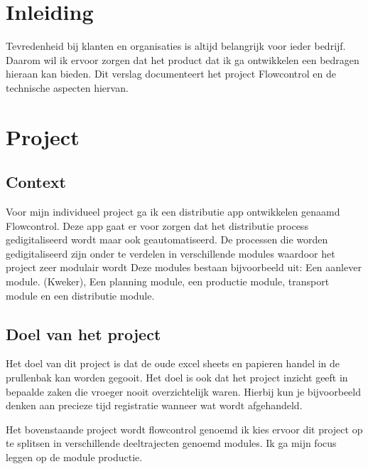 \documentclass[11pt, twoside]{report}
\begin{document}
    
    \newpage
    \tableofcontents
    \newpage

    \clearpage
    \setcounter{page}{1}

    \chapter{Inleiding}
    \label{ch:inleiding}
    Tevredenheid bij klanten en organisaties is altijd belangrijk voor ieder bedrijf.
    Daarom wil ik ervoor zorgen dat het product dat ik ga ontwikkelen een bedragen hieraan kan bieden.
    Dit verslag documenteert het project Flowcontrol en de technische aspecten hiervan.

    \chapter{Project}
    \label{ch:project}
    \section{Context}
    \label{sec:context}
    Voor mijn individueel project ga ik een distributie app ontwikkelen genaamd Flowcontrol.
    Deze app gaat er voor zorgen dat het distributie process gedigitaliseerd wordt maar ook geautomatiseerd.
    De processen die worden gedigitaliseerd zijn onder te verdelen in verschillende modules waardoor het project zeer modulair wordt
    Deze modules bestaan bijvoorbeeld uit: Een aanlever module. (Kweker), Een planning module, een productie module, transport module en een distributie module.

    \section{Doel van het project}
    \label{sec:doel-van-het-project}
    Het doel van dit project is dat de oude excel sheets en papieren handel in de prullenbak kan worden gegooit.
    Het doel is ook dat het project inzicht geeft in bepaalde zaken die vroeger nooit overzichtelijk waren.
    Hierbij kun je bijvoorbeeld denken aan precieze tijd registratie wanneer wat wordt afgehandeld.

    Het bovenstaande project wordt flowcontrol genoemd ik kies ervoor dit project op te splitsen in verschillende deeltrajecten genoemd modules.
    Ik ga mijn focus leggen op de module productie.
\end{document}
